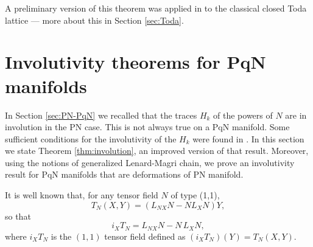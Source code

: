\documentclass[12pt]{article}
\begin{document}
A preliminary version of this theorem was applied in \cite{FMP2023} to the classical closed Toda lattice --- more about this in Section \ref{sec:Toda}.

\section{Involutivity theorems for PqN manifolds}
\label{sec:involutivity}

In Section \ref{sec:PN-PqN} we recalled that the traces $H_k$ of the powers of $N$ are in involution in the PN case. This is not always true on a PqN manifold.
Some sufficient conditions for the involutivity of the $H_k$ were found in \cite{FMOP2020}. In this section we state Theorem \ref{thm:involution}, an improved version of that result. Moreover, using the notions of generalized Lenard-Magri chain, we prove an involutivity result for PqN manifolds that are deformations of PN manifold.%

It is well known that, for any tensor field $N$ of type (1,1),   
\begin{equation}
\label{tndef2}
T_N(X,Y)=(L_{NX}N-NL_XN)Y,
\end{equation}
so that 
\begin{equation}
\label{ff1}
i_XT_N=L_{NX}N-N\, L_X N,
\end{equation}
where $i_XT_N$ is the $(1,1)$ tensor field %
defined as $(i_XT_N)(Y)=T_N(X,Y)$. 
\end{document}
